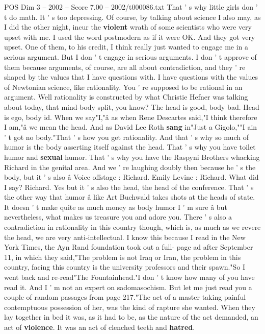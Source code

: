 \begin{textsample}{POS Dim 3 – 2002 – Score 7.00 – 2002/t000086.txt}
That ' s why little girls don ' t do math.
It ' s too depressing.
Of course, by talking about science I also may, as I did the other night, incur the \textbf{violent} wrath of some scientists who were very upset with me.
I used the word postmodern as if it were OK.
And they got very upset.
One of them, to his credit, I think really just wanted to engage me in a serious argument.
But I don ' t engage in serious arguments.
I don ' t approve of them because arguments, of course, are all about contradiction, and they ' re shaped by the values that I have questions with.
I have questions with the values of Newtonian science, like rationality.
You ' re supposed to be rational in an argument.
Well rationality is constructed by what Christie Hefner was talking about today, that mind-body split, you know?
The head is good, body bad.
Head is ego, body id.
When we say"I,"â as when Rene Descartes said,"I think therefore I am,"â we mean the head.
And as David Lee Roth \textbf{sang} in"Just a Gigolo,""I ain ' t got no body."That ' s how you get rationality.
And that ' s why so much of humor is the body asserting itself against the head.
That ' s why you have toilet humor and \textbf{sexual} humor.
That ' s why you have the Raspyni Brothers whacking Richard in the genital area.
And we ' re laughing doubly then because he ' s the body, but it ' s also â Voice offstage : Richard.
Emily Levine : Richard.
What did I say?
Richard.
Yes but it ' s also the head, the head of the conference.
That ' s the other way that humor â like Art Buchwald takes shots at the heads of state.
It doesn ' t make quite as much money as body humor I ' m sure â but nevertheless, what makes us treasure you and adore you.
There ' s also a contradiction in rationality in this country though, which is, as much as we revere the head, we are very anti-intellectual.
I know this because I read in the New York Times, the Ayn Rand foundation took out a full- page ad after September 11, in which they said,"The problem is not Iraq or Iran, the problem in this country, facing this country is the university professors and their spawn."So I went back and re-read"The Fountainhead."I don ' t know how many of you have read it.
And I ' m not an expert on sadomasochism.
But let me just read you a couple of random passages from page 217."The act of a master taking painful contemptuous possession of her, was the kind of rapture she wanted.
When they lay together in bed it was, as it had to be, as the nature of the act demanded, an act of \textbf{violence}.
It was an act of clenched teeth and \textbf{hatred}.

\end{textsample}
